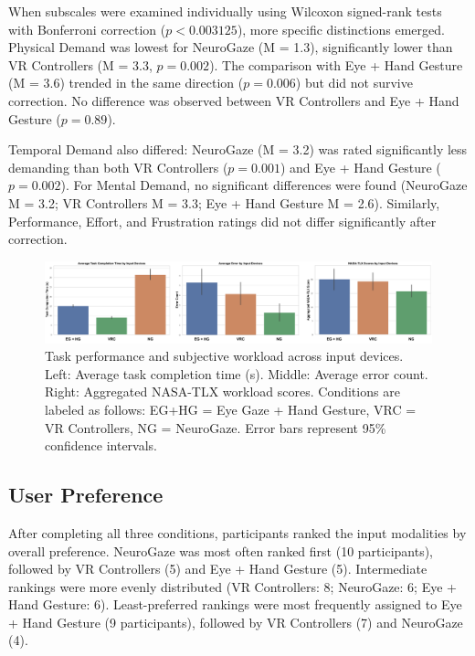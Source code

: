 \documentclass[utf8]{FrontiersinHarvard} %
\begin{document}
When subscales were examined individually using Wilcoxon signed-rank tests with Bonferroni correction ($p < 0.003125$), more specific distinctions emerged. Physical Demand was lowest for NeuroGaze (M = 1.3), significantly lower than VR Controllers (M = 3.3, $p = 0.002$). The comparison with Eye + Hand Gesture (M = 3.6) trended in the same direction ($p = 0.006$) but did not survive correction. No difference was observed between VR Controllers and Eye + Hand Gesture ($p = 0.89$).

Temporal Demand also differed: NeuroGaze (M = 3.2) was rated significantly less demanding than both VR Controllers ($p = 0.001$) and Eye + Hand Gesture ($p = 0.002$).
For Mental Demand, no significant differences were found (NeuroGaze M = 3.2; VR Controllers M = 3.3; Eye + Hand Gesture M = 2.6). Similarly, Performance, Effort, and Frustration ratings did not differ significantly after correction.

\begin{figure}[ht]
\begin{center}
\includegraphics[width=17cm]{figures/graphs.png}
\end{center}
\caption{Task performance and subjective workload across input devices. 
Left: Average task completion time (s). 
Middle: Average error count. 
Right: Aggregated NASA-TLX workload scores. 
Conditions are labeled as follows: EG+HG = Eye Gaze + Hand Gesture, VRC = VR Controllers, NG = NeuroGaze. 
Error bars represent 95\% confidence intervals.}
\label{fig:graphs}
\end{figure}

\subsection{User Preference}
After completing all three conditions, participants ranked the input modalities by overall preference. NeuroGaze was most often ranked first (10 participants), followed by VR Controllers (5) and Eye + Hand Gesture (5). Intermediate rankings were more evenly distributed (VR Controllers: 8; NeuroGaze: 6; Eye + Hand Gesture: 6). Least-preferred rankings were most frequently assigned to Eye + Hand Gesture (9 participants), followed by VR Controllers (7) and NeuroGaze (4). 
\end{document}
